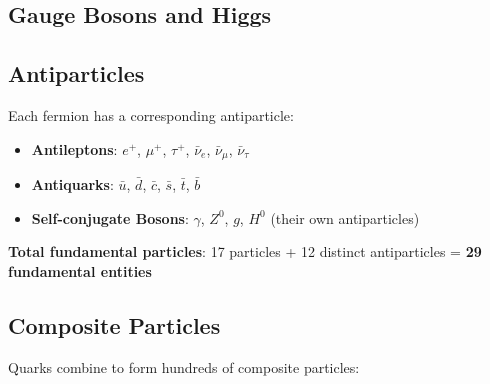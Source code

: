 	\subsection{Gauge Bosons and Higgs}
	
	\begin{table}[htbp]
		\centering
		\caption{Standard Model Gauge Bosons and Higgs Boson}
		\label{tab:sm_bosons}
	\end{table}
	
	\subsection{Antiparticles}
	
	Each fermion has a corresponding antiparticle:
	
	\begin{itemize}
		\item \textbf{Antileptons}: $e^+$, $\mu^+$, $\tau^+$, $\bar{\nu}_e$, $\bar{\nu}_\mu$, $\bar{\nu}_\tau$
		\item \textbf{Antiquarks}: $\bar{u}$, $\bar{d}$, $\bar{c}$, $\bar{s}$, $\bar{t}$, $\bar{b}$
		\item \textbf{Self-conjugate Bosons}: $\gamma$, $Z^0$, $g$, $H^0$ (their own antiparticles)
	\end{itemize}
	
	\textbf{Total fundamental particles}: 17 particles + 12 distinct antiparticles = \textbf{29 fundamental entities}
	
	\subsection{Composite Particles}
	
	Quarks combine to form hundreds of composite particles:
	
